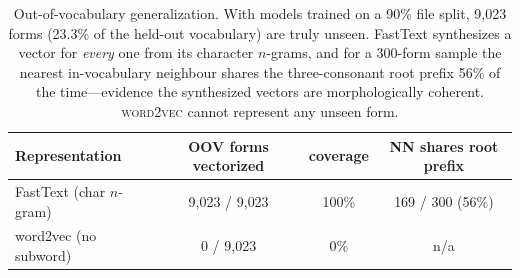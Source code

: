 \begin{table}[t]
  \centering
  \begin{tabular}{lccc}
    \toprule
    \textbf{Representation} & \textbf{OOV forms vectorized} & \textbf{coverage}
    & \textbf{NN shares root prefix} \\
    \midrule
    FastText (char $n$-gram) & 9{,}023 / 9{,}023 & 100\% & 169 / 300 \;(56\%) \\
    word2vec (no subword)    & 0 / 9{,}023      & 0\%   & n/a \\
    \bottomrule
  \end{tabular}
  \caption{Out-of-vocabulary generalization. With models trained on a 90\% file
  split, 9{,}023 forms (23.3\% of the held-out vocabulary) are truly unseen.
  FastText synthesizes a vector for \emph{every} one from its character
  $n$-grams, and for a 300-form sample the nearest in-vocabulary neighbour shares
  the three-consonant root prefix 56\% of the time---evidence the synthesized
  vectors are morphologically coherent. \textsc{word2vec} cannot represent any
  unseen form.}
  \label{tab:oov}
\end{table}
